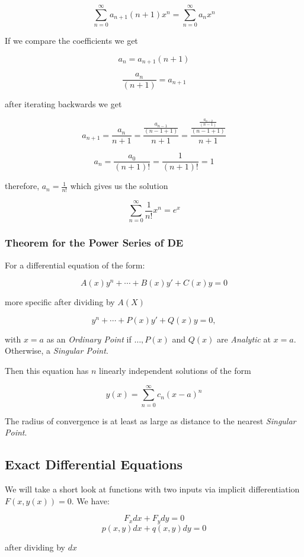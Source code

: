 \[
\sum_{n = 0}^{\infty} a_{n + 1}(n + 1)x^{n} = \sum_{n = 0}^{\infty} a_n x^n
\]

If we compare the coefficients we get

\[
a_n = a_{n+1}(n+1)
\]

\[
\frac{a_n}{(n + 1)} = a_{n+1}
\]


after iterating backwards we get

\[
a_{n + 1} = \frac{a_n}{n + 1} = \frac{\frac{a_{n - 1}}{(n - 1 +1)}}{n + 1} = \frac{\frac{\frac{a_{n - 2}}{(n - 1)}}{(n - 1 + 1)}}{n + 1}   
\]

\[
a_n = \frac{a_0}{(n + 1)!} = \frac{1}{(n + 1)!} = 1
\]

therefore, \(a_n = \frac{1}{n!}\) which gives us the solution

\[\sum_{n = 0}^{\infty}\frac{1}{n!}x^n = e^x\]

\subsubsection{Theorem for the Power Series of DE}

For a differential equation of the form:

\[
A(x)y^{n} + \cdots + B(x)y' + C(x)y = 0
\]

more specific after dividing by \(A(X)\)

\[
y^{n} + \cdots + P(x)y' + Q(x)y = 0,
\]

with \(x = a\) as an \emph{Ordinary Point} if \(\dots, P(x)\) and \(Q(x)\) are 
\emph{Analytic} at \(x = a\). Otherwise, a \emph{Singular Point}.
\vspace{\baselineskip}

Then this equation has \(n\) linearly independent solutions of the form

\[
y(x) = \sum_{n = 0}^{\infty} c_n {(x - a)}^n
\]

The radius of convergence is at least as large as distance to the nearest \emph{Singular Point}.

\subsection{Exact Differential Equations}

We will take a short look at functions with two inputs via implicit differentiation \(F(x,y(x)) = 0\).
We have:

\[
F_x dx + F_y dy = 0
\]
\[
p(x,y)dx + q(x,y)dy = 0
\]

after dividing by \(dx\)

